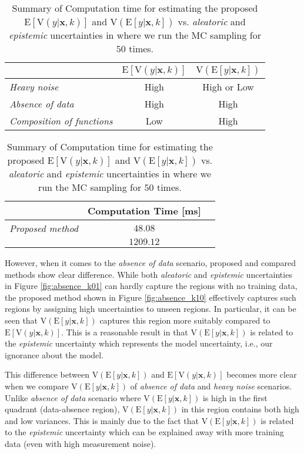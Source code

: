 \documentclass[letterpaper, 10 pt, conference]{ieeeconf}  %
\def\Bx{\mathbf{x}} \def\By{\mathbf{y}} \def\Bp{\mathbf{p}}
\begin{document}
\begin{table}[h!]  \center 
	\begin{tabular}{ l | c | c  } 
                    & $\mathrm{E}[\mathrm{V}(y|\Bx, k)]$ & $\mathrm{V}(\mathrm{E}[y|\Bx, k])$ \\
		\hline \hline
		\textit{Heavy noise}	
			& High 		& High or Low
		\\ 
		\textit{Absence of data}     
			& High 		& High			
		\\
		\textit{Composition of functions}  	
			& Low 		& High
		\\
	\end{tabular}
	\caption{Summary of 
		$\mathrm{E}[\mathrm{V}(y|\Bx, k)]$
		and 
		$\mathrm{V}(\mathrm{E}[y|\Bx, k])$ on 
		\textit{absence of data}, \textit{heavy noise}, and 
		\textit{composition of functions} scenarios.
	}
	\label{tbl:summ}
	\begin{tabular}{ l | c | c  } 
                    & Computation Time [ms]
                  \\
		\hline \hline
		\textit{Proposed method}	
			& $48.08$ 	
		\\ 
		\textit{\cite{Kendall_17}}     
			& $1209.12$ 	
		\\
	\end{tabular}
	\caption{Summary of 
		Computation time for estimating 
		the proposed 
		$\mathrm{E}[\mathrm{V}(y|\Bx, k)]$ 
		and 
		$\mathrm{V}(\mathrm{E}[y|\Bx, k])$
		vs.
		\textit{aleatoric} and \textit{epistemic}
		uncertainties in 
		\cite{Kendall_17} where we run the MC sampling
		for $50$ times. 
	}
	\label{tbl:time}
\end{table}



However, when it comes to the \textit{absence of data} scenario,
proposed and compared methods show clear difference.  
While both \textit{aleatoric} and \textit{epistemic} uncertainties 
in Figure \ref{fig:absence_k01}
can hardly capture the regions with no training data,
the proposed method 
shown in Figure \ref{fig:absence_k10}
effectively captures such regions by assigning 
high uncertainties to unseen regions. 
In particular, it can be seen that $\mathrm{V}(\mathrm{E}[y|\Bx, k])$ 
captures this region more suitably compared to 
$\mathrm{E}[\mathrm{V}(y|\Bx, k)]$. 
This is a reasonable result in that $\mathrm{V}(\mathrm{E}[y|\Bx, k])$
is related to the \textit{epistemic} uncertainty 
which represents the model uncertainty,
i.e., our ignorance about the model. 


This difference between $\mathrm{V}(\mathrm{E}[y|\Bx, k])$ 
and $\mathrm{E}[\mathrm{V}(y|\Bx, k)]$ becomes more clear when 
we compare
$\mathrm{V}(\mathrm{E}[y|\Bx, k])$ of \textit{absence of data}
and \textit{heavy noise} scenarios.
Unlike \textit{absence of data} scenario where 
$\mathrm{V}(\mathrm{E}[y|\Bx, k])$ is high in the first quadrant
(data-absence region), 
$\mathrm{V}(\mathrm{E}[y|\Bx, k])$ in this region
contains both high and low variances.
This is mainly due to the fact that $\mathrm{V}(\mathrm{E}[y|\Bx, k])$
is related to the \textit{epistemic} uncertainty which can be 
explained away with more training data
(even with high measurement noise). 
\end{document}
